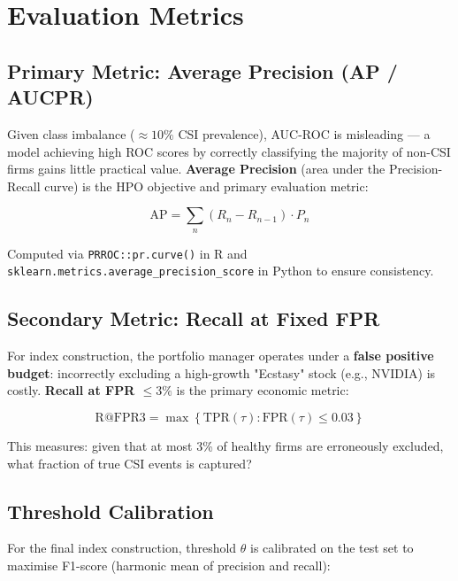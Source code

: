 \documentclass{report}\usepackage[]{graphicx}\usepackage[table]{xcolor}
\begin{document}
\section{Evaluation Metrics}

\subsection{Primary Metric: Average Precision (AP / AUCPR)}

Given class imbalance ($\approx 10\%$ CSI prevalence), AUC-ROC is misleading — a model 
achieving high ROC scores by correctly classifying the majority of non-CSI firms gains 
little practical value. \textbf{Average Precision} (area under the Precision-Recall curve) 
is the HPO objective and primary evaluation metric:

\begin{equation}
    \text{AP} = \sum_n (R_n - R_{n-1}) \cdot P_n
\end{equation}

Computed via \texttt{PRROC::pr.curve()} in R and \texttt{sklearn.metrics.average\_precision\_score} 
in Python to ensure consistency.

\subsection{Secondary Metric: Recall at Fixed FPR}

For index construction, the portfolio manager operates under a \textbf{false positive budget}: 
incorrectly excluding a high-growth "Ecstasy" stock (e.g., NVIDIA) is costly. 
\textbf{Recall at FPR $\leq 3\%$} is the primary economic metric:

\begin{equation}
    \text{R@FPR3} = \max \left\{ \text{TPR}(\tau) : \text{FPR}(\tau) \leq 0.03 \right\}
\end{equation}

This measures: given that at most 3\% of healthy firms are erroneously excluded, 
what fraction of true CSI events is captured?

\subsection{Threshold Calibration}

For the final index construction, threshold $\theta$ is calibrated on the test set 
to maximise F1-score (harmonic mean of precision and recall):
\end{document}

